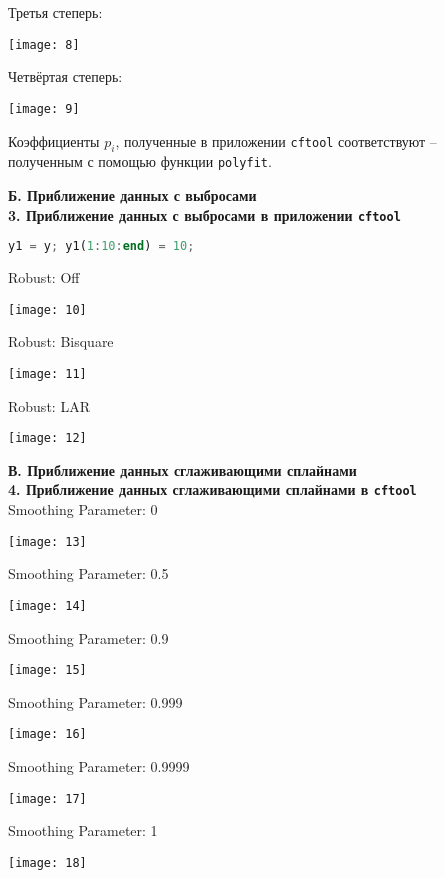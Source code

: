 \documentclass[a4paper]{article}
\begin{document}
\newpage

Третья степерь:
\begin{center}
    \texttt{[image: 8]}
\end{center}
Четвёртая степерь:
\begin{center}
    \texttt{[image: 9]}
\end{center}
Коэффициенты $p_i$, полученные в приложении \texttt{cftool} соответствуют -- полученным с помощью функции \texttt{polyfit}.
\newpage

{\Large{\textbf{Б. Приближение данных с выбросами}}}\\
{\textbf{3. Приближение данных с выбросами в приложении \texttt{cftool}}}
\begin{lstlisting}[language=Octave, firstnumber=66]
y1 = y; y1(1:10:end) = 10;
\end{lstlisting}
Robust: Off
\begin{center}
    \texttt{[image: 10]}
\end{center}
Robust: Bisquare
\begin{center}
    \texttt{[image: 11]}
\end{center}

\newpage
Robust: LAR
\begin{center}
    \texttt{[image: 12]}
\end{center}

\newpage

{\Large{\textbf{В. Приближение данных сглаживающими сплайнами}}}\\
{\textbf{4. Приближение данных сглаживающими сплайнами в \texttt{cftool}}}\\
Smoothing Parameter: 0
\begin{center}
    \texttt{[image: 13]}
\end{center}
Smoothing Parameter: 0.5
\begin{center}
    \texttt{[image: 14]}
\end{center}

\newpage
Smoothing Parameter: 0.9
\begin{center}
    \texttt{[image: 15]}
\end{center}
Smoothing Parameter: 0.999
\begin{center}
    \texttt{[image: 16]}
\end{center}

\newpage
Smoothing Parameter: 0.9999
\begin{center}
    \texttt{[image: 17]}
\end{center}
Smoothing Parameter: 1
\begin{center}
    \texttt{[image: 18]}
\end{center}
\end{document}
